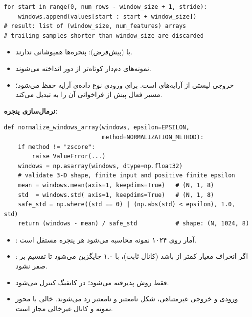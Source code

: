 \documentclass{article}
\newcommand{\pmdash}{\lr{---}}
\newcommand{\mysubsection}[1]{
\par\vspace{0.5cm}
\noindent\textcolor{main_blue}{\large\textbf{#1}}
\par\vspace{0.2cm}
}
\begin{document}
\begin{latin}
\begin{lstlisting}
for start in range(0, num_rows - window_size + 1, stride):
    windows.append(values[start : start + window_size])
# result: list of (window_size, num_features) arrays
# trailing samples shorter than window_size are discarded
\end{lstlisting}
\end{latin}

\begin{itemize}
\item با  (پیش‌فرض): پنجره‌ها همپوشانی ندارند.
\item نمونه‌های دم‌دار کوتاه‌تر از  دور انداخته می‌شوند.
\item خروجی لیستی از آرایه‌های  است. برای ورودی  نوع داده‌ی آرایه حفظ می‌شود؛ مسیر فعال پیش از فراخوانی آن را به  تبدیل می‌کند.
\end{itemize}

\mysubsection{نرمال‌سازی پنجره: }

\begin{latin}
\begin{lstlisting}
def normalize_windows_array(windows, epsilon=EPSILON,
                            method=NORMALIZATION_METHOD):
    if method != "zscore":
        raise ValueError(...)
    windows = np.asarray(windows, dtype=np.float32)
    # validate 3-D shape, finite input and positive finite epsilon
    mean = windows.mean(axis=1, keepdims=True)   # (N, 1, 8)
    std  = windows.std( axis=1, keepdims=True)   # (N, 1, 8)
    safe_std = np.where((std == 0) | (np.abs(std) < epsilon), 1.0, std)
    return (windows - mean) / safe_std           # shape: (N, 1024, 8)
\end{lstlisting}
\end{latin}

\begin{itemize}
\item {}: آمار روی ۱۰۲۴ نمونه محاسبه می‌شود \pmdash{} هر پنجره مستقل است.
\item {}: اگر انحراف معیار کمتر از  باشد (کانال ثابت)،
با ۱.۰ جایگزین می‌شود تا تقسیم بر صفر نشود.
\item فقط روش  پذیرفته می‌شود؛  در کانفیگ کنترل می‌شود.
\item ورودی و خروجی غیرمتناهی، شکل نامعتبر و  نامعتبر رد می‌شوند.  خالی با محور نمونه و کانال غیرخالی مجاز است.
\end{itemize}
\end{document}
